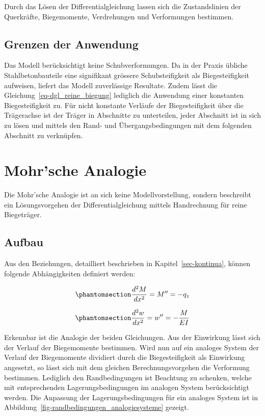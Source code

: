 \documentclass[
  12pt,
  letterpaper,
  egregdoesnotlikesansseriftitles]{scrreprt}
\begin{document}
Durch das Lösen der Differentialgleichung lassen sich die Zustandslinien
der Querkräfte, Biegemomente, Verdrehungen und Verformungen bestimmen.

\subsection{Grenzen der Anwendung}\label{grenzen-der-anwendung}

Das Modell berücksichtigt keine Schubverformungen. Da in der Praxis
übliche Stahlbetonbauteile eine signifikant grössere Schubsteifigkeit
als Biegesteifigkeit aufweisen, liefert das Modell zuverlässige
Resultate. Zudem lässt die Gleichung~\ref{eq-dgl_reine_biegung}
lediglich die Anwendung einer konstanten Biegesteifigkeit zu. Für nicht
konstante Verläufe der Biegesteifigkeit über die Trägerachse ist der
Träger in Abschnitte zu unterteilen, jeder Abschnitt ist in sich zu
lösen und mittels den Rand- und Übergangsbedingungen mit dem folgenden
Abschnitt zu verknüpfen.

\section{Mohr'sche Analogie}\label{sec-mohrsche_analogie}

Die Mohr'sche Analogie ist an sich keine Modellvorstellung, sondern
beschreibt ein Lösungsvorgehen der Differentialgleichung mittels
Handrechnung für reine Biegeträger.

\subsection{Aufbau}\label{aufbau-1}

Aus den Beziehungen, detailliert beschrieben in
Kapitel~\ref{sec-kontinua}, können folgende Abhängigkeiten definiert
werden:

\begin{equation}\phantomsection\label{eq-mohr1}{
\frac{d^2M}{dx^2} = M'' = -q_z
}\end{equation}

\begin{equation}\phantomsection\label{eq-mohr2}{
\frac{d^2w}{dx^2} = w'' = -\frac{M}{EI}
}\end{equation}

Erkennbar ist die Analogie der beiden Gleichungen. Aus der Einwirkung
lässt sich der Verlauf der Biegemomente bestimmen. Wird nun auf ein
analoges System der Verlauf der Biegemomente dividiert durch die
Biegesteifigkeit als Einwirkung angesetzt, so lässt sich mit dem
gleichen Berechnungsvorgehen die Verformung bestimmen. Lediglich den
Randbedingungen ist Beachtung zu schenken, welche mit entsprechenden
Lagerungsbedingungen im analogen System berücksichtigt werden. Die
Anpassung der Lagerungsbedingungen für ein analoges System ist in
Abbildung~\ref{fig-randbedingungen_analogiesysteme} gezeigt.
\end{document}
